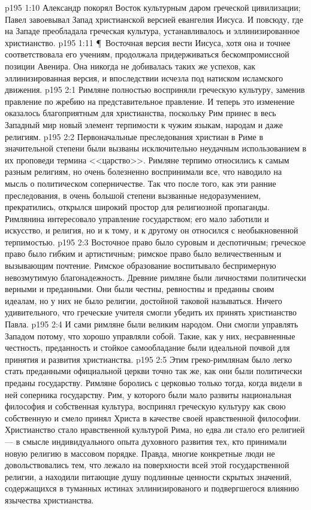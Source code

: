 \vs p195 1:10 Александр покорял Восток культурным даром греческой цивилизации; Павел завоевывал Запад христианской версией евангелия Иисуса. И повсюду, где на Западе преобладала греческая культура, устанавливалось и эллинизированное христианство.
\vs p195 1:11 \P\ Восточная версия вести Иисуса, хотя она и точнее соответствовала его учениям, продолжала придерживаться бескомпромиссной позиции Авенира. Она никогда не добивалась таких же успехов, как эллинизированная версия, и впоследствии исчезла под натиском исламского движения.
\vs p195 2:1 Римляне полностью восприняли греческую культуру, заменив правление по жребию на представительное правление. И теперь это изменение оказалось благоприятным для христианства, поскольку Рим принес в весь Западный мир новый элемент терпимости к чужим языкам, народам и даже религиям.
\vs p195 2:2 Первоначальные преследования христиан в Риме в значительной степени были вызваны исключительно неудачным использованием в их проповеди термина <<царство>>. Римляне терпимо относились к самым разным религиям, но очень болезненно воспринимали все, что наводило на мысль о политическом соперничестве. Так что после того, как эти ранние преследования, в очень большой степени вызванные недоразумением, прекратились, открылся широкий простор для религиозной пропаганды. Римлянина интересовало управление государством; его мало заботили и искусство, и религия, но и к тому, и к другому он относился с необыкновенной терпимостью.
\vs p195 2:3 Восточное право было суровым и деспотичным; греческое право было гибким и артистичным; римское право было величественным и вызывающим почтение. Римское образование воспитывало беспримерную невозмутимую благонадежность. Древние римляне были личностями политически верными и преданными. Они были честны, ревностны и преданны своим идеалам, но у них не было религии, достойной таковой называться. Ничего удивительного, что греческие учителя смогли убедить их принять христианство Павла.
\vs p195 2:4 И сами римляне были великим народом. Они смогли управлять Западом потому, что хорошо управляли собой. Такие, как у них, несравненные честность, преданность и стойкое самообладание были идеальной почвой для принятия и развития христианства.
\vs p195 2:5 Этим греко\hyp{}римлянам было легко стать преданными официальной церкви точно так же, как они были политически преданы государству. Римляне боролись с церковью только тогда, когда видели в ней соперника государству. Рим, у которого были мало развиты национальная философия и собственная культура, воспринял греческую культуру как свою собственную и смело принял Христа в качестве своей нравственной философии. Христианство стало нравственной культурой Рима, но едва ли стало его религией --- в смысле индивидуального опыта духовного развития тех, кто принимали новую религию в массовом порядке. Правда, многие конкретные люди не довольствовались тем, что лежало на поверхности всей этой государственной религии, а находили питающие душу подлинные ценности скрытых значений, содержащихся в туманных истинах эллинизированого и подвергшегося влиянию язычества христианства.
